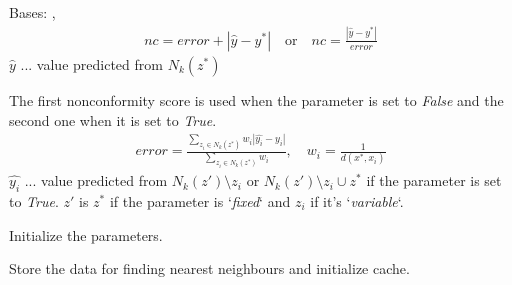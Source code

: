 \documentclass[letterpaper,10pt,english]{sphinxmanual}
\begin{document}
\begin{fulllineitems}
\label{cp.nonconformity:cp.nonconformity.LOORegrNC}
Bases: {\hyperref[cp.nonconformity:cp.nonconformity.NearestNeighbours]{}}, {\hyperref[cp.nonconformity:cp.nonconformity.RegrNC]{}}
\begin{equation*}
\begin{split}\mathit{nc} = \mathit{error} + |\hat{y}-y^{*}|
\quad \text{or} \quad
\mathit{nc} = \frac{|\hat{y}-y^{*}|}{\mathit{error}}\end{split}
\end{equation*}
\(\hat{y}\) ... value predicted from \(N_k(z^*)\)

The first nonconformity score is used when the parameter  is set to \emph{False}
and the second one when it is set to \emph{True}.
\begin{equation*}
\begin{split}\mathit{error} = \frac {\sum_{z_i \in N_k(z^*)} w_i |\hat{y_i}-y_i|} {\sum_{z_i \in N_k(z^*)} w_i},
\quad w_i = \frac{1}{d(x^*, x_i)}\end{split}
\end{equation*}
\(\hat{y_i}\) ... value predicted from \(N_k(z') \setminus z_i\) or
\(N_k(z') \setminus z_i \cup z^*\) if the parameter  is set to \emph{True}. \(z'\) is
\(z^*\) if the  parameter is `\emph{fixed}` and \(z_i\) if it's `\emph{variable}`.

\begin{fulllineitems}
\label{cp.nonconformity:cp.nonconformity.LOORegrNC.__init__}
Initialize the parameters.

\end{fulllineitems}


\begin{fulllineitems}
\label{cp.nonconformity:cp.nonconformity.LOORegrNC.fit}
Store the data for finding nearest neighbours and initialize cache.


\end{fulllineitems}
\end{fulllineitems}
\end{document}
